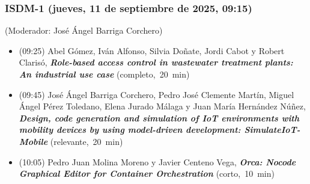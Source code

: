 \begin{frame}
  \frametitle{ISDM-1 (jueves, 11 de septiembre de 2025, 09:15)}
{\small (Moderador: José Ángel Barriga Corchero)}
\begin{itemize}


\item {(09:25) Abel Gómez, Iván Alfonso, Silvia Doñate, Jordi Cabot y Robert Clarisó}, %
      {\bfseries\itshape Role-based access control in wastewater treatment plants: An industrial use case} %
      {(completo,~20~min)}
      

\item {(09:45) José Ángel Barriga Corchero, Pedro José Clemente Martín, Miguel Ángel Pérez Toledano, Elena Jurado Málaga y Juan María Hernández Núñez}, %
      {\bfseries\itshape Design, code generation and simulation of IoT environments with mobility devices by using model-driven development: SimulateIoT-Mobile} %
      {(relevante,~20~min)}
      

\item {(10:05) Pedro Juan Molina Moreno y Javier Centeno Vega}, %
      {\bfseries\itshape Orca: Nocode Graphical Editor for Container Orchestration} %
      {(corto,~10~min)}
      

\end{itemize}
\end{frame}